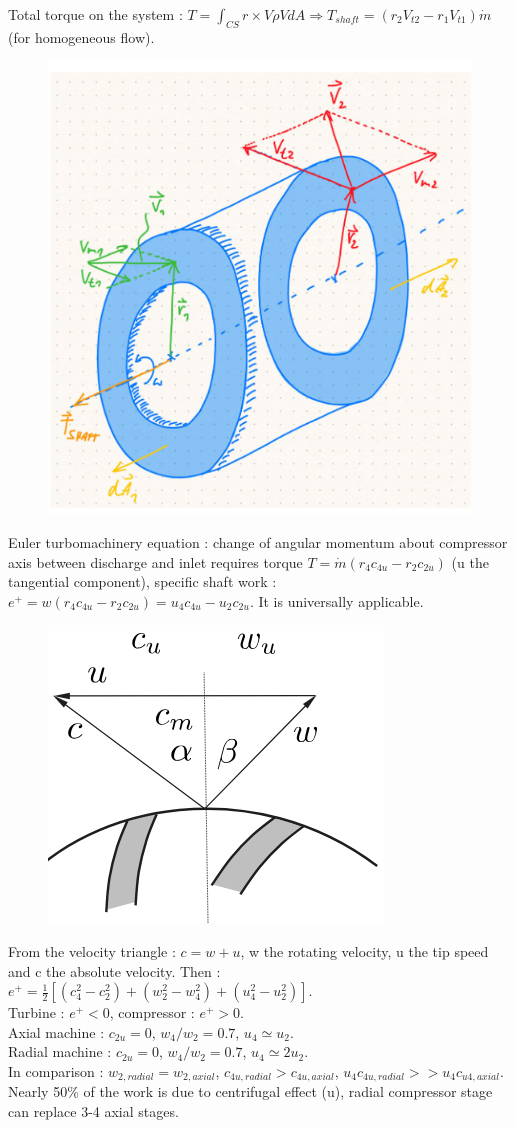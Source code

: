 \documentclass[../main.tex]{subfiles}
\begin{document}
Total torque on the system : $T = \int_{CS} r \times V \rho VdA \Rightarrow T_{shaft} = (r_2V_{t2}-r_1 V_{t1})\dot{m}$ (for homogeneous flow). 
\begin{figure}[hbt!]
    \centering
    \includegraphics[width=0.5\linewidth]{IMAGES/HP/Screenshot from 2025-04-17 10-21-05.png}
\end{figure}

Euler turbomachinery equation : change of angular momentum about compressor axis between discharge and inlet requires torque $T = \dot{m} (r_4 c_{4u} - r_2 c_{2u})$ (u the tangential component), specific shaft work : $e^+ = w(r_4 c_{4u} - r_2 c_{2u}) = u_4 c_{4u} - u_2 c_{2u}$. It is universally applicable.\\

\begin{figure}[hbt!]
    \centering
    \includegraphics[width=0.5\linewidth]{IMAGES/HP/Screenshot from 2025-04-17 10-36-50.png}
\end{figure}
From the velocity triangle : $c = w+u$, w the rotating velocity, u the tip speed and c the absolute velocity. Then : $e^+ = \frac{1}{2} [(c_4^2-c_2^2) + (w_2^2-w_4^2) + (u_4^2-u_2^2)]$. \\
Turbine : $e^+<0$, compressor : $e^+>0$.\\
Axial machine : $c_{2u} = 0$, $w_4/w_2 = 0.7$, $u_4 \simeq u_2$.\\
Radial machine : $c_{2u} = 0$, $w_4/w_2 = 0.7$, $u_4 \simeq 2 u_2$.\\
In comparison : $w_{2,radial} = w_{2,axial}$, $c_{4u, radial} > c_{4u, axial}$, $u_4 c_{4u,radial} >> u_4 c_{u4,axial}$.\\
\warning Nearly 50\% of the work is due to centrifugal effect (u), radial compressor stage can replace 3-4 axial stages.\\
\end{document}
